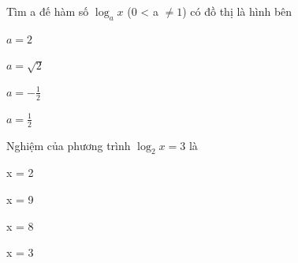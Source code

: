 \begin{question}[type=multiple_choice,difficulty=2,code={I-11}]
Tìm a đế hàm số $ \log_a x $ (0 < a $ \neq 1 $) có đồ thị là hình bên



\begin{choice}[label=A]
$ a=2 $
\end{choice}

\begin{choice}[correct,label=B]
$ a=\sqrt{2} $
\end{choice}

\begin{choice}[label=C]
$ a=-\frac{1}{2} $
\end{choice}

\begin{choice}[label=D]
$ a=\frac{1}{2} $
\end{choice}

\end{question}

\begin{question}[type=multiple_choice,difficulty=1,code={I-12}]
Nghiệm của phương trình $ \log_{2} x = 3 $ là

\begin{choice}[label=A]
x = 2
\end{choice}

\begin{choice}[label=B]
x = 9
\end{choice}

\begin{choice}[correct,label=C]
x = 8
\end{choice}

\begin{choice}[label=D]
x = 3
\end{choice}

\end{question}

